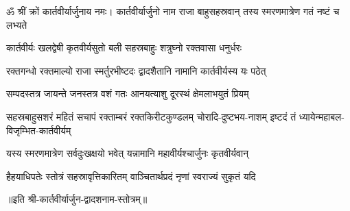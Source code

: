 

ॐ श्रीं क्रों कार्तवीर्यार्जुनाय नमः।
\twolineshloka
{कार्तवीर्यार्जुनो नाम राजा बाहुसहस्रवान्}
{तस्य स्मरणमात्रेण गतं नष्टं च लभ्यते}%

\twolineshloka
{कार्तवीर्यः खलद्वेषी कृतवीर्यसुतो बली}
{सहस्रबाहुः शत्रुघ्नो रक्तवासा धनुर्धरः}%

\twolineshloka
{रक्तगन्धो रक्तमाल्यो राजा स्मर्तुरभीष्टदः}
{द्वादशैतानि नामानि कार्तवीर्यस्य यः पठेत्}%

\twolineshloka
{सम्पदस्तत्र जायन्ते जनस्तत्र वशं गतः}
{आनयत्याशु दूरस्थं क्षेमलाभयुतं प्रियम्}%

\fourlineindentedshloka
{सहस्रबाहुसशरं महितं सचापं}
{रक्ताम्बरं रक्तकिरीटकुण्डलम्}
{चोरादि-दुष्टभय-नाशम् इष्टदं तं}
{ध्यायेन्महाबल-विजृम्भित-कार्तवीर्यम्}%

\twolineshloka
{यस्य स्मरणमात्रेण सर्वदुःखक्षयो भवेत्}
{यन्नामानि महावीर्यश्चार्जुनः कृतवीर्यवान्}%

\twolineshloka
{हैहयाधिपतेः स्तोत्रं सहस्रावृत्तिकारितम्}
{वाञ्चितार्थप्रदं नृणां स्वराज्यं सुकृतं यदि}%

॥इति श्री-कार्तवीर्यार्जुन-द्वादशनाम-स्तोत्रम्॥